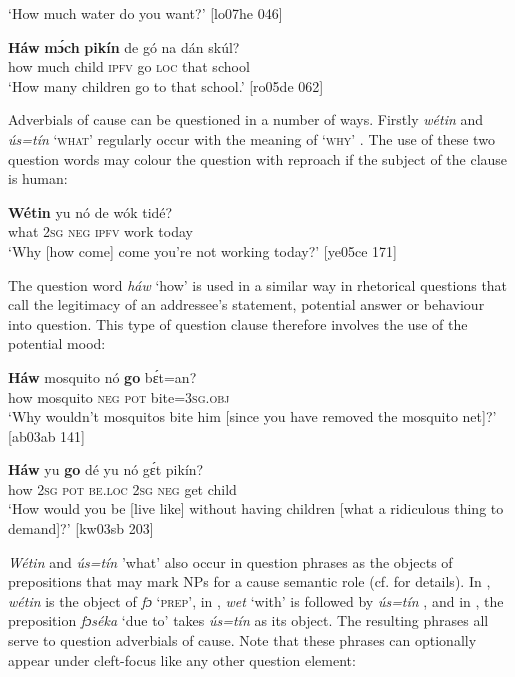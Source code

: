 \glt ‘How much water do you want?’ [lo07he 046]
\z


\ea%
    \label{ex:key:638}
    \gll \textbf{Háw}  \textbf{mɔ́ch}  \textbf{pikín}  de  gó  na  dán  skúl?\\
how    much  child  \textsc{ipfv}  go  \textsc{loc}  that  school\\
\glt ‘How many children go to that school.’ [ro05de 062]
\z

Adverbials of cause can be questioned in a number of ways. Firstly \textit{wétin} and \textit{ús=tín} ‘\textsc{what’} regularly occur with the meaning of ‘\textsc{why}’ . The use of these two question words may colour the question with reproach if the subject of the clause is human:


\ea%
    \label{ex:key:639}
    \gll \textbf{Wétin}  yu  nó  de  wók    tidé?\\
what  \textsc{2sg}  \textsc{neg}  \textsc{ipfv}  work  today\\

\glt ‘Why [how come] come you’re not working today?’ [ye05ce 171]
\z

The question word \textit{háw} ‘how’ is used in a similar way in rhetorical questions that call the legitimacy of an addressee’s statement, potential answer or behaviour into question. This type of question clause therefore involves the use of the potential mood: 


\ea%
    \label{ex:key:640}
    \gll \textbf{Háw}  mosquito  nó  \textbf{go}  bɛ́t=an?\\
how    mosquito  \textsc{neg}  \textsc{pot}  bite=\textsc{3sg.obj}\\

\glt ‘Why wouldn’t mosquitos bite him [since you have 
removed the mosquito net]?’ [ab03ab 141]
\z


\ea%
    \label{ex:key:641}
    \gll \textbf{Háw}  yu  \textbf{go}  dé    yu  nó  gɛ́t  pikín?\\
how    \textsc{2sg}  \textsc{pot}  \textsc{be.loc}  \textsc{2sg}  \textsc{neg}  get  child\\

\glt ‘How would you be [live like] without having children 
[what a ridiculous thing to demand]?’ [kw03sb 203]
\z

\textit{Wétin} and \textit{ús=tín} ’what’ also occur in question phrases as the objects of prepositions that may mark NPs for a cause semantic role (cf.  for details). In , \textit{wétin} is the object of \textit{fɔ} \textsc{‘prep’}, in , \textit{wet} ‘with’ is followed by \textit{ús=tín} , and in , the preposition \textit{fɔséka} ‘due to’ takes \textit{ús=tín} as its object. The resulting phrases all serve to question adverbials of cause. Note that these phrases can optionally appear under cleft-focus like any other question element: 


